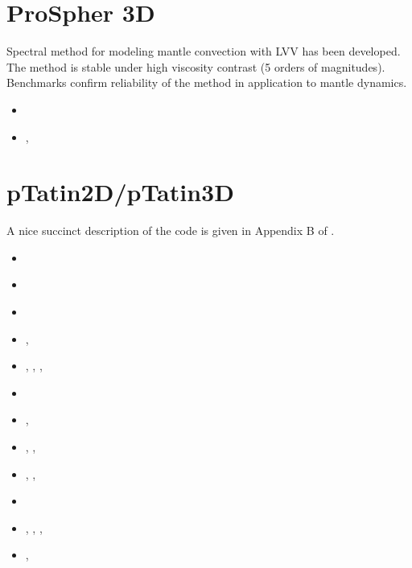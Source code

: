 \section{ProSpher 3D}

Spectral method for modeling mantle convection with LVV has been developed.
The method is stable under high viscosity contrast (5 orders of magnitudes).
Benchmarks confirm reliability of the method in application to mantle dynamics.

\begin{small}
\begin{itemize}
\item[\twothousandthirteen] \textcite{pekr13} 
\item[\twothousandtwenty]   \textcite{peke20}, \textcite{pekk20}
\end{itemize}
\end{small}

\section{pTatin2D/pTatin3D}
A nice succinct description of the code is given in Appendix B of \cite{lemh17}. 
\begin{small}
\begin{itemize}
\item[\twothousandthirteen]   \textcite{phil13}
\item[\twothousandfourteen]   \textcite{mabl14}
\item[\twothousandfifteen]    \textcite{mabl15}
\item[\twothousandseventeen]  \textcite{lemh17},  \textcite{magm17}
\item[\twothousandeighteen]   \textcite{jolp18},  \textcite{lecd18}, \textcite{jolp18b},
                              \textcite{hapl18}
\item[\twothousandnineteen]   \textcite{jolm19}
\item[\twothousandtwenty]     \textcite{duhm20},  \textcite{jolm20}
\item[\twothousandtwentyone]  \textcite{jokd21},  \textcite{iola21}, \textcite{pelg21}
\item[\twothousandtwentytwo]  \textcite{lala22},  \textcite{iobr22}, \textcite{wohw22}
\item[\twothousandtwentyfour] \textcite{pelj24}
\item[\twothousandtwentyfive] \textcite{johm25},  \textcite{wohm25}, \textcite{jomh25},
                              \textcite{zhlp25}
\item[\twothousandtwentysix]  \textcite{gacl26},  \textcite{lepj26}
\end{itemize}
\end{small}


